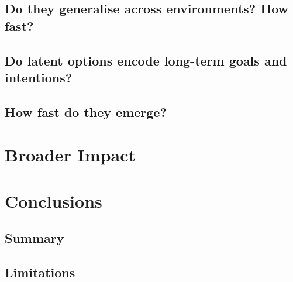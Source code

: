 \documentclass{article}
\theoremstyle{postulate}
\begin{document}
\subsection{Do they generalise across environments? How fast?}

\subsection{Do latent options encode long-term goals and intentions?}


\subsection{How fast do they emerge?}











\section{Broader Impact}
\label{sec:broader-impact}





\section{Conclusions}
\label{sec:conclusions}

\subsection{Summary}

\subsection{Limitations}
\end{document}
